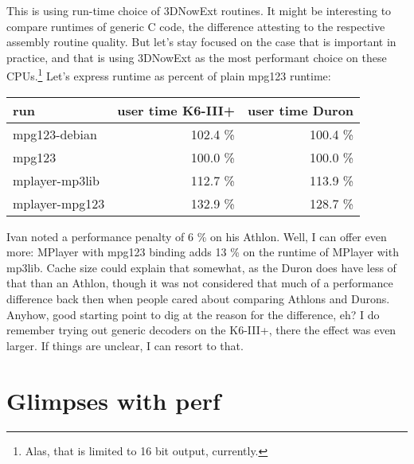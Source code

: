 \documentclass[a4paper,12pt]{scrartcl}
\begin{document}
This is using run-time choice of 3DNowExt routines. It might be interesting to compare runtimes of generic C code, the difference attesting to the respective assembly routine quality.
But let's stay focused on the case that is important in practice, and that is using 3DNowExt as the most performant choice on these CPUs.\footnote{Alas, that is limited to 16 bit output, currently.}
Let's express runtime as percent of plain mpg123 runtime:
\begin{center}
\begin{tabular}{lrr}
run & user time K6-III+ & user time Duron \\
\hline
mpg123-debian & 102.4 \% & 100.4 \% \\
mpg123 & 100.0 \% & 100.0 \% \\
mplayer-mp3lib & 112.7 \% & 113.9 \% \\
mplayer-mpg123 & 132.9 \% & 128.7 \%
\end{tabular}
\end{center}

Ivan noted a performance penalty of 6 \% on his Athlon. Well, I can offer even more: MPlayer with mpg123 binding adds 13 \% on the runtime of MPlayer with mp3lib. Cache size could explain that somewhat, as the Duron does have less of that than an Athlon, though it was not considered that much of a performance difference back then when people cared about comparing Athlons and Durons.
Anyhow, good starting point to dig at the reason for the difference, eh? I do remember trying out generic decoders on the K6-III+, there the effect was even larger. If things are unclear, I can resort to that.

\section{Glimpses with perf}
\end{document}
